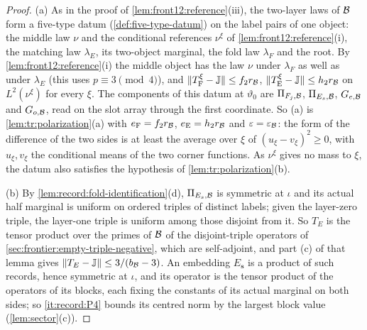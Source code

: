 \begin{proof}
(a) As in the proof of \cref{lem:front12:reference}(iii), the two-layer laws
of $\mathcal B$ form a five-type datum (\cref{def:five-type-datum}) on the label
pairs of one object: the middle law $\nu$ and the conditional references
$\nu^\xi$ of \cref{lem:front12:reference}(i), the matching law $\lambda_E$, its
two-object marginal, the fold law $\lambda_F$ and the root. By
\cref{lem:front12:reference}(i) the middle object has the law $\nu$ under
$\lambda_F$ as well as under $\lambda_E$ (this uses $p\equiv3\pmod4$), and
$\|T^\xi_{\rm F}-\mathbb J\|\le f_2r_\mathcal B$, $\|T^\xi_{\rm E}-\mathbb J\|\le h_2r_\mathcal B$
on $L^2(\nu^\xi)$ for every $\xi$. The components of this datum at
$\vartheta_0$ are $\Pi_{F_j,\mathcal B}$, $\Pi_{E_s,\mathcal B}$, $G_{e,\mathcal B}$ and $G_{o,\mathcal B}$,
read on the slot array through the first coordinate. So (a) is
\cref{lem:tr:polarization}(a) with $e_{\rm F}=f_2r_\mathcal B$, $e_{\rm E}=h_2r_\mathcal B$ and
$\varepsilon=\varepsilon_\mathcal B$: the form of the difference of the two sides is at
least the average over $\xi$ of $(u_\xi-v_\xi)^2\ge0$, with $u_\xi,v_\xi$ the
conditional means of the two corner functions. As $\nu^\xi$ gives no mass to
$\xi$, the datum also satisfies the hypothesis of \cref{lem:tr:polarization}(b).

(b) By \cref{lem:record:fold-identification}(d), $\Pi_{E_s,\mathcal B}$ is symmetric
at $\iota$ and its actual half marginal is uniform on ordered triples of
distinct labels; given the layer-zero triple, the layer-one triple is uniform
among those disjoint from it. So $T_E$ is the tensor product over the primes of
$\mathcal B$ of the disjoint-triple operators of \cref{sec:frontier:empty-triple-negative},
which are self-adjoint, and part (c) of that lemma gives
$\|T_E-\mathbb J\|\le3/(b_\mathcal B-3)$. An embedding $E_{\mathbf s}$ is a product of such
records, hence symmetric at $\iota$, and its operator is the tensor product of
the operators of its blocks, each fixing the constants of its actual marginal
on both sides; so \ref{it:record:P4} bounds its centred norm by the largest
block value (\cref{lem:sector}(c)).
\end{proof}

